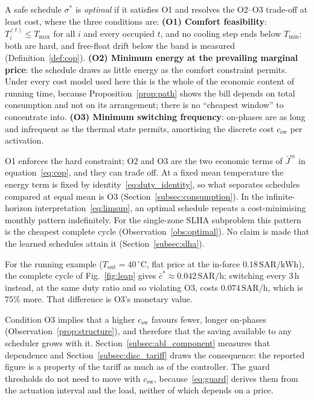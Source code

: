 \documentclass[3p,twocolumn,number]{elsarticle}
\newcommand{\sched}{\sigma}
\newcommand{\Tmin}{T_{\min}}
\newcommand{\Tmax}{T_{\max}}
\newcommand{\Tout}{T_{\mathrm{out}}}
\newcommand{\csw}{c_{\mathrm{sw}}}
\newcommand{\Jbar}{\bar{J}}
\newcommand{\SAR}{\text{SAR}}
\newcommand{\kWh}{\text{kWh}}
\begin{document}
A safe schedule $\sched^*$ is \emph{optimal} if it satisfies O1 and resolves the O2--O3 trade-off at least cost, where the three conditions are: \textbf{(O1) Comfort feasibility}: $T_i^{(t)}\le\Tmax$ for all $i$ and every occupied $t$, and no cooling step ends below $\Tmin$; both are hard, and free-float drift below the band is measured (Definition~\ref{def:cop}). \textbf{(O2) Minimum energy at the prevailing marginal price}: the schedule draws as little energy as the comfort constraint permits. Under every cost model used here this is the whole of the economic content of running time, because Proposition~\ref{prop:path} shows the bill depends on total consumption and not on its arrangement; there is no ``cheapest window'' to concentrate into. \textbf{(O3) Minimum switching frequency}: on-phases are as long and infrequent as the thermal state permits, amortising the discrete cost $\csw$ per activation.
 
O1 enforces the hard constraint; O2 and O3 are the two economic terms of $\Jbar^m$ in equation~\eqref{eq:cop}, and they can trade off. At a fixed mean temperature the energy term is fixed by identity~\eqref{eq:duty_identity}, so what separates schedules compared at equal mean is O3 (Section~\ref{subsec:consumption}). In the infinite-horizon interpretation~\eqref{eq:limsup}, an optimal schedule repeats a cost-minimising monthly pattern indefinitely. For the single-zone SLHA subproblem this pattern is the cheapest complete cycle (Observation~\ref{obs:optimal}). No claim is made that the learned schedules attain it (Section~\ref{subsec:slha}).
 
For the running example ($\Tout=40\,^\circ$C, flat price at the in-force $0.18\,\SAR/\kWh$), the complete cycle of Fig.~\ref{fig:leap} gives $\bar{c}^*\approx0.042\,\SAR/\text{h}$; switching every $3\,$h instead, at the same duty ratio and so violating O3, costs $0.074\,\SAR/\text{h}$, which is $75\%$ more. That difference is O3's monetary value.
 
\begin{remark}
\label{rem:csw}
Condition O3 implies that a higher $\csw$ favours fewer, longer on-phases (Observation~\ref{prop:structure}), and therefore that the saving available to any scheduler grows with it. Section~\ref{subsec:abl_component} measures that dependence and Section~\ref{subsec:disc_tariff} draws the consequence: the reported figure is a property of the tariff as much as of the controller. The guard thresholds do not need to move with $\csw$, because~\eqref{eq:guard} derives them from the actuation interval and the load, neither of which depends on a price.
\end{remark}
 
\end{document}

